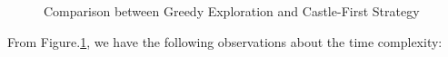 \begin{figure} [H]
      \caption{Comparison between {\sc Greedy} Exploration and {\sc Castle-First} Strategy } 
  \label{fig:C_Move}%
\end{figure}

From Figure.\ref{fig:C_Move}, we have the following observations about the  time complexity:
